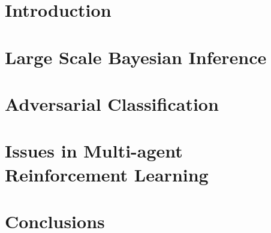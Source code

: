 \documentclass[a4paper, 11pt, openright, twoside]{reportPhD}
\numberwithin{figure}{chapter}
\numberwithin{table}{chapter}
\numberwithin{equation}{chapter}
\begin{document}

\indice
\indicetablas
\indicefiguras
\indicealgoritmos


\chapter{Introduction}\label{cha:intro}
\setcounter{page}{1}


\begin{subappendices}

\end{subappendices}



\chapter{Large Scale Bayesian Inference}\label{cha:bayes}


\begin{subappendices}

\end{subappendices}


\chapter{Adversarial Classification}\label{cha:adv}



\chapter{Issues in Multi-agent Reinforcement Learning}\label{cha:ararl}



\begin{subappendices}

\end{subappendices}


\chapter{Conclusions}\label{cha:conclusions}




{}
\newrefcontext[sorting=nty]

\printbibliography
\end{document}
